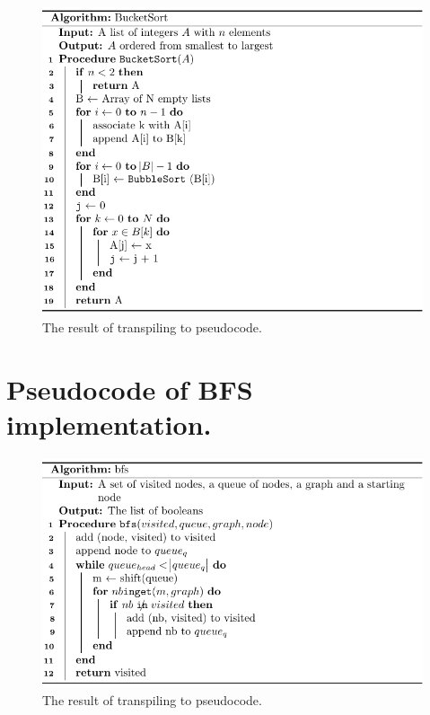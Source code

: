 \begin{figure}[!htb]
    \centering
    \includegraphics[scale=.8]{assets/chapter6/sort/BucketSort_tbp.pdf}
    \caption{The result of transpiling  to pseudocode.}
    \label{bucketSortTBP}
\end{figure}

\section{Pseudocode of BFS implementation.}
\label{Pseudocode of BFS implementation.}

\begin{figure}[!htb]
    \centering
    \includegraphics[scale=.8]{assets/chapter6/graph/BFS_tbp.pdf}
    \caption{The result of transpiling  to pseudocode.}
    \label{bfsTBP}
\end{figure}

